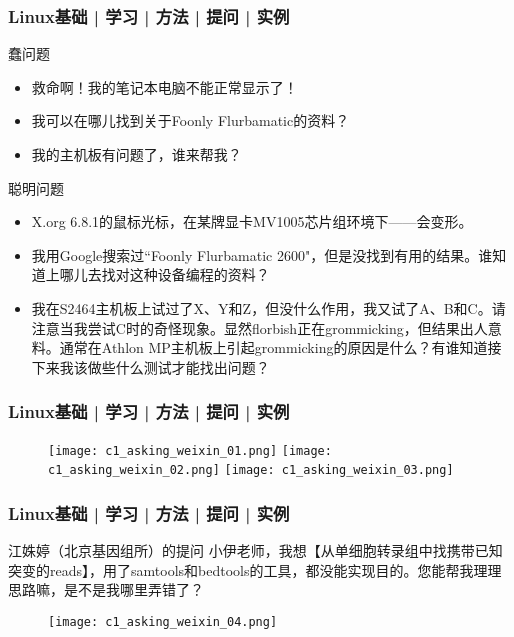 \begin{frame}
  \frametitle{Linux基础 | 学习 | 方法 | 提问 | 实例}
  \begin{block}{蠢问题}
    \begin{itemize}
      \item 救命啊！我的笔记本电脑不能正常显示了！
      \item 我可以在哪儿找到关于Foonly Flurbamatic的资料？
      \item 我的主机板有问题了，谁来帮我？
    \end{itemize}
  \end{block}
  \pause
  \vspace{-0.5em}
  \begin{block}{聪明问题}
    \begin{itemize}
      \item X.org 6.8.1的鼠标光标，在某牌显卡MV1005芯片组环境下——会变形。
      \item 我用Google搜索过``Foonly Flurbamatic 2600"，但是没找到有用的结果。谁知道上哪儿去找对这种设备编程的资料？
      \item 我在S2464主机板上试过了X、Y和Z，但没什么作用，我又试了A、B和C。请注意当我尝试C时的奇怪现象。显然florbish正在grommicking，但结果出人意料。通常在Athlon MP主机板上引起grommicking的原因是什么？有谁知道接下来我该做些什么测试才能找出问题？
    \end{itemize}
  \end{block}
\end{frame}

\begin{frame}
  \frametitle{Linux基础 | 学习 | 方法 | 提问 | 实例}
  \begin{figure}
    \centering
    \texttt{[image: c1\_asking\_weixin\_01.png]}
    \texttt{[image: c1\_asking\_weixin\_02.png]}
    \texttt{[image: c1\_asking\_weixin\_03.png]}
  \end{figure}
\end{frame}

\begin{frame}
  \frametitle{Linux基础 | 学习 | 方法 | 提问 | 实例}
  \begin{block}{江姝婷（北京基因组所）的提问}
{\footnotesize 小伊老师，我想【从单细胞转录组中找携带已知突变的reads】，用了samtools和bedtools的工具，都没能实现目的。您能帮我理理思路嘛，是不是我哪里弄错了？}
  \end{block}
  \vspace{-0.3em}
  \begin{figure}
    \centering
    \texttt{[image: c1\_asking\_weixin\_04.png]}
  \end{figure}
\end{frame}

